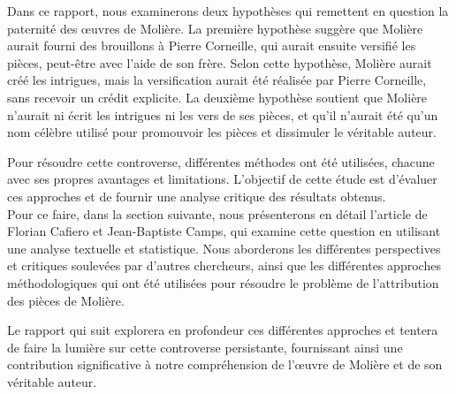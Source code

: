 \vspace{\baselineskip}
\hspace{0,5cm} Dans ce rapport, nous examinerons deux hypothèses qui remettent
en question la
paternité des œuvres de Molière. La première hypothèse suggère que Molière
aurait fourni des brouillons à Pierre Corneille, qui aurait ensuite versifié les
pièces, peut-être avec l'aide de son frère. Selon cette hypothèse, Molière
aurait créé les intrigues, mais la versification aurait été réalisée par Pierre
Corneille, sans recevoir un crédit explicite. La deuxième hypothèse soutient que
Molière n'aurait ni écrit les intrigues ni les vers de ses pièces, et qu'il
n'aurait été qu'un nom célèbre utilisé pour promouvoir les pièces et dissimuler
le véritable auteur.

\hspace{0,5 cm} Pour résoudre cette controverse, différentes méthodes ont été
utilisées, chacune
avec ses propres avantages et limitations. L'objectif de cette étude est
d'évaluer ces approches et de fournir une analyse critique des résultats
obtenus.
\\Pour ce faire, dans la section suivante, nous présenterons en détail l'article de Florian
Cafiero et Jean-Baptiste Camps, qui examine cette question en utilisant une
analyse textuelle et statistique. Nous aborderons les différentes perspectives
et critiques soulevées par d'autres chercheurs, ainsi que les différentes
approches méthodologiques qui ont été utilisées pour résoudre le problème de
l'attribution des pièces de Molière.


Le rapport qui suit explorera en profondeur ces différentes approches et tentera
de faire la lumière sur cette controverse persistante, fournissant ainsi une
contribution significative à notre compréhension de l'œuvre de Molière et de son
véritable auteur.
